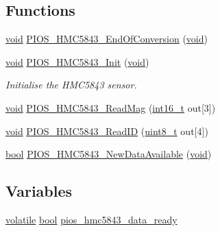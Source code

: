 \subsection*{Functions}
\begin{DoxyCompactItemize}
\item 
\hyperlink{group___n_a_m_e_ga18028b8badbf1ea7e704ccac3c488e82}{void} \hyperlink{group___p_i_o_s___h_m_c5843_gac016f8f6dfcacc6663a7802760513dfe}{P\-I\-O\-S\-\_\-\-H\-M\-C5843\-\_\-\-End\-Of\-Conversion} (\hyperlink{group___n_a_m_e_ga18028b8badbf1ea7e704ccac3c488e82}{void})
\item 
\hyperlink{group___n_a_m_e_ga18028b8badbf1ea7e704ccac3c488e82}{void} \hyperlink{group___p_i_o_s___h_m_c5843_gafd99d34d6d59ae4b38f66bfa43321c91}{P\-I\-O\-S\-\_\-\-H\-M\-C5843\-\_\-\-Init} (\hyperlink{group___n_a_m_e_ga18028b8badbf1ea7e704ccac3c488e82}{void})
\begin{DoxyCompactList}\small\item\em Initialise the H\-M\-C5843 sensor. \end{DoxyCompactList}\item 
\hyperlink{group___n_a_m_e_ga18028b8badbf1ea7e704ccac3c488e82}{void} \hyperlink{group___p_i_o_s___h_m_c5843_gae47b960756eb5e51acb4f30c4a0158e4}{P\-I\-O\-S\-\_\-\-H\-M\-C5843\-\_\-\-Read\-Mag} (\hyperlink{stdint_8h_aa343fa3b3d06292b959ffdd4c4703b06}{int16\-\_\-t} out\mbox{[}3\mbox{]})
\item 
\hyperlink{group___n_a_m_e_ga18028b8badbf1ea7e704ccac3c488e82}{void} \hyperlink{group___p_i_o_s___h_m_c5843_ga957c354cdb5c4fa92ea39d26536813cb}{P\-I\-O\-S\-\_\-\-H\-M\-C5843\-\_\-\-Read\-I\-D} (\hyperlink{stdint_8h_aba7bc1797add20fe3efdf37ced1182c5}{uint8\-\_\-t} out\mbox{[}4\mbox{]})
\item 
\hyperlink{group___exported__types_gaf6a258d8f3ee5206d682d799316314b1}{bool} \hyperlink{group___p_i_o_s___h_m_c5843_ga24a7367bbf88f9e9d7508ee3248cdfeb}{P\-I\-O\-S\-\_\-\-H\-M\-C5843\-\_\-\-New\-Data\-Available} (\hyperlink{group___n_a_m_e_ga18028b8badbf1ea7e704ccac3c488e82}{void})
\end{DoxyCompactItemize}
\subsection*{Variables}
\begin{DoxyCompactItemize}
\item 
\hyperlink{group___c_m_s_i_s___core___instruction_interface_gad7d93af13046b0378601b85c8c16673b}{volatile} \hyperlink{group___exported__types_gaf6a258d8f3ee5206d682d799316314b1}{bool} \hyperlink{group___p_i_o_s___h_m_c5843_ga1291044661f010eff5b969133a2e905b}{pios\-\_\-hmc5843\-\_\-data\-\_\-ready}
\end{DoxyCompactItemize}


